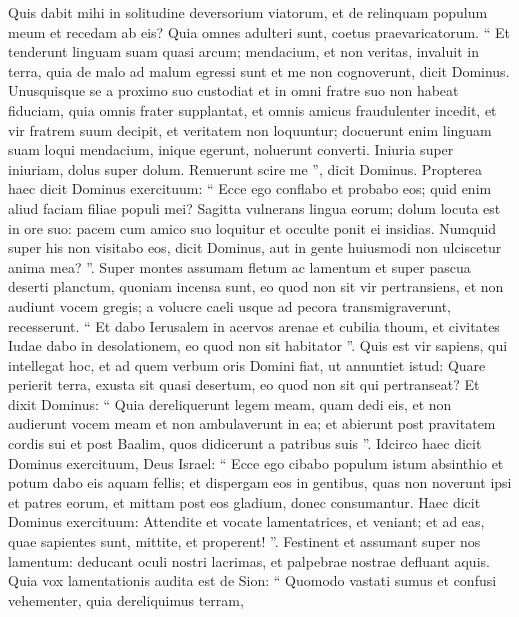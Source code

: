 \begin{biblechapter}
\begin{biblechapter}
\begin{biblechapter}
\begin{biblechapter}
\begin{biblechapter}
\begin{biblechapter}
\begin{biblechapter}
\begin{biblechapter}
\begin{biblechapter}
\verse Quis dabit mihi in solitudine deversorium viatorum,
 et de relinquam populum meum et recedam ab eis?
 Quia omnes adulteri sunt,
 coetus praevaricatorum.
 \verse “ Et tenderunt linguam suam quasi arcum;
 mendacium, et non veritas, invaluit in terra,
 quia de malo ad malum egressi sunt
 et me non cognoverunt,
 dicit Dominus.
 \verse Unusquisque se a proximo suo custodiat
 et in omni fratre suo non habeat fiduciam,
 quia omnis frater supplantat,
 et omnis amicus fraudulenter incedit,
 \verse et vir fratrem suum decipit,
 et veritatem non loquuntur;
 docuerunt enim linguam suam loqui mendacium,
 inique egerunt, noluerunt converti.
 \verse Iniuria super iniuriam,
 dolus super dolum.
 Renuerunt scire me ”,
 dicit Dominus.
 \verse Propterea haec dicit Dominus exercituum:
 “ Ecce ego conflabo et probabo eos;
 quid enim aliud faciam filiae populi mei?
 \verse Sagitta vulnerans lingua eorum;
 dolum locuta est in ore suo:
 pacem cum amico suo loquitur
 et occulte ponit ei insidias.
 \verse Numquid super his non visitabo eos,
 dicit Dominus,
 aut in gente huiusmodi
 non ulciscetur anima mea? ”.
 \verse Super montes assumam fletum ac lamentum
 et super pascua deserti planctum,
 quoniam incensa sunt,
 eo quod non sit vir pertransiens,
 et non audiunt vocem gregis;
 a volucre caeli usque ad pecora
 transmigraverunt, recesserunt.
 \verse “ Et dabo Ierusalem in acervos arenae
 et cubilia thoum,
 et civitates Iudae dabo in desolationem,
 eo quod non sit habitator ”.
 \verse Quis est vir sapiens, qui intellegat hoc,
 et ad quem verbum oris Domini fiat,
 ut annuntiet istud:
 Quare perierit terra,
 exusta sit quasi desertum,
 eo quod non sit qui pertranseat?
 \verse Et dixit Dominus: “ Quia dereliquerunt legem meam, quam dedi eis, et non audierunt vocem meam et non ambulaverunt in ea; 
\verse et abierunt post pravitatem cordis sui et post Baalim, quos didicerunt a patribus suis ”. 
\verse Idcirco haec dicit Dominus exercituum, Deus Israel: “ Ecce ego cibabo populum istum absinthio et potum dabo eis aquam fellis; 
\verse et dispergam eos in gentibus, quas non noverunt ipsi et patres eorum, et mittam post eos gladium, donec consumantur.
 \verse Haec dicit Dominus exercituum:
 Attendite et vocate lamentatrices, et veniant;
 et ad eas, quae sapientes sunt, mittite, et properent! ”.
 \verse Festinent
 et assumant super nos lamentum:
 deducant oculi nostri lacrimas,
 et palpebrae nostrae defluant aquis.
 \verse Quia vox lamentationis audita est de Sion:
 “ Quomodo vastati sumus et confusi vehementer,
 quia dereliquimus terram,

\end{biblechapter}
\end{biblechapter}
\end{biblechapter}
\end{biblechapter}
\end{biblechapter}
\end{biblechapter}
\end{biblechapter}
\end{biblechapter}
\end{biblechapter}
